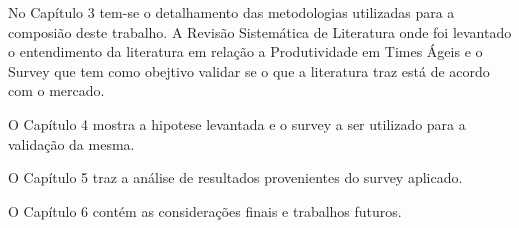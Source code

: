   No Capítulo 3 tem-se o detalhamento das metodologias utilizadas para a composião deste trabalho. A Revisão Sistemática de Literatura onde foi levantado o entendimento
  da literatura em relação a Produtividade em Times Ágeis e o Survey que tem como obejtivo validar se o que a literatura traz está de acordo com o mercado.

  O Capítulo 4 mostra a hipotese levantada e o survey a ser utilizado para a validação da mesma.

  O Capítulo 5 traz a análise de resultados provenientes do survey aplicado.

  O Capítulo 6 contém as considerações finais e trabalhos futuros.

